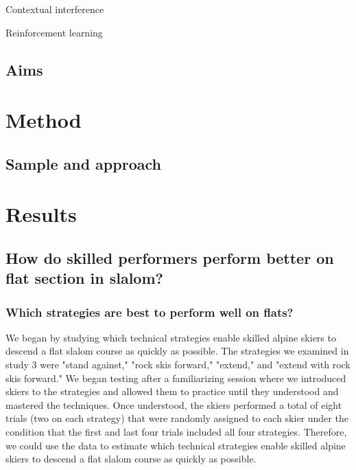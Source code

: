\documentclass{report}
\begin{document}
Contextual interference


Reinforcement learning





\subsection{Aims}




\section{Method}

\subsection{Sample and approach}


\section{Results}


\subsection{How do skilled performers perform better on flat section in slalom?}


\subsubsection{Which strategies are best to perform well on flats?}
We began by studying which technical strategies enable skilled alpine skiers to descend a flat slalom course as quickly as possible. The strategies we examined in study 3 were "stand against," "rock skis forward," "extend," and "extend with rock skis forward." We began testing after a familiarizing session where we introduced skiers to the strategies and allowed them to practice until they understood and mastered the techniques. Once understood, the skiers performed a total of eight trials (two on each strategy) that were randomly assigned to each skier under the condition that the first and last four trials included all four strategies. Therefore, we could use the data to estimate which technical strategies enable skilled alpine skiers to descend a flat slalom course as quickly as possible.
\end{document}
